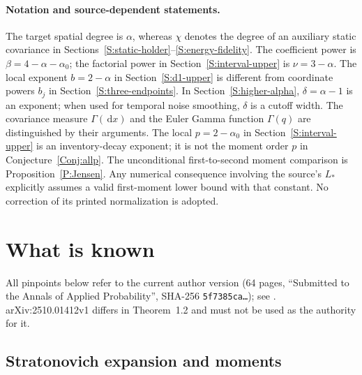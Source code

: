 \documentclass[12pt]{article}
\numberwithin{equation}{section}
\theoremstyle{definition}
\newcommand{\ud}{\,\mathrm{d}}
\begin{document}
\paragraph{Notation and source-dependent statements.}
The target spatial degree is $\alpha$, whereas $\chi$ denotes the degree
of an auxiliary static covariance in
Sections~\ref{S:static-holder}--\ref{S:energy-fidelity}.
The coefficient power is $\beta=4-\alpha-\alpha_0$; the factorial power in
Section~\ref{S:interval-upper} is $\nu=3-\alpha$.
The local exponent $b=2-\alpha$ in Section~\ref{S:d1-upper} is different
from coordinate powers $b_j$ in Section~\ref{S:three-endpoints}.
In Section~\ref{S:higher-alpha}, $\delta=\alpha-1$ is an exponent;
when used for temporal noise smoothing, $\delta$ is a cutoff width.
The covariance measure $\Gamma(\ud x)$ and the Euler Gamma function
$\Gamma(q)$ are distinguished by their arguments. The local
$p=2-\alpha_0$ in Section~\ref{S:interval-upper} is an inventory-decay
exponent; it is not the moment order $p$ in Conjecture~\ref{Conj:allp}.
The unconditional first-to-second moment comparison is
Proposition~\ref{P:Jensen}. Any numerical consequence involving the
source's $L_*$ explicitly assumes a valid first-moment lower bound with
that constant. No correction of its printed normalization is adopted.

\section{What is known}\label{S:known}

All pinpoints below refer to the current author version
\cite{chen:author2026:time-dependency} (64 pages, ``Submitted to the Annals
of Applied Probability'', SHA-256 \texttt{5f7385ca\dots}); see
. arXiv:2510.01412v1
\cite{chen:25:time-dependency} differs in Theorem~1.2 and must not be used as
the authority for it.

\subsection{Stratonovich expansion and moments}
\end{document}
